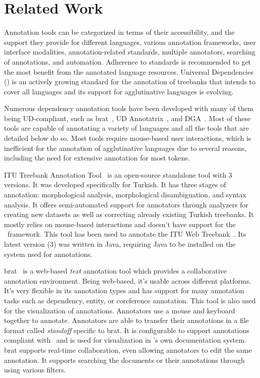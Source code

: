\section{Related Work}
\label{sec:related}

Annotation tools can be categorized in terms of their accessibility, and the support they provide for different languages, various annotation frameworks, user interface modalities, annotation-related standards, multiple annotators, searching of annotations, and automation.
Adherence to standards is recommended to get the most benefit from the annotated language resources.
Universal Dependencies~\cite{ud} (\ud) is an actively growing standard for the annotation of treebanks that intends to cover all languages and its support for agglutinative languages is evolving.

Numerous dependency annotation tools have been developed with many of them being UD-compliant, such as brat~\cite{brat}, UD Annotatrix~\cite{ud-annotatrix}, and DGA~\cite{dgannotator}.
Most of these tools are capable of annotating a variety of languages and all the tools that are detailed below do so.
Most tools require mouse-based user interactions, which is inefficient for the annotation of agglutinative languages due to several reasons, including the need for extensive annotation for most tokens.

ITU Treebank Annotation Tool~\cite{itu-annotation-tool} is an open-source standalone tool with 3 versions.
It was developed specifically for Turkish.
It has three stages of annotation: morphological analysis, morphological disambiguation, and syntax analysis.
It offers semi-automated support for annotators through analyzers for creating new datasets as well as correcting already existing Turkish treebanks.
It mostly relies on mouse-based interactions and doesn't have support for the \ud\ framework.
This tool has been used to annotate the ITU Web Treebank~\cite{itu-annotation-tool}. %
Its latest version (3) was written in Java, requiring Java to be installed on the system used for annotations.

brat~\cite{brat} is a web-based \textit{text} annotation tool which provides a collaborative annotation environment.
Being web-based, it's usable across different platforms.
It's very flexible in its annotation types and has support for many annotation tasks such as dependency, entity, or coreference annotation.
This tool is also used for the visualization of annotations.
Annotators use a mouse and keyboard together to annotate.
Annotators are able to transfer their annotations in a file format called \textit{standoff} specific to brat.
It is configurable to support annotations compliant with \ud\ and is used for visualization in \ud's own documentation system.
brat supports real-time collaboration, even allowing annotators to edit the same annotation.
It supports searching the documents or their annotations through using various filters.

